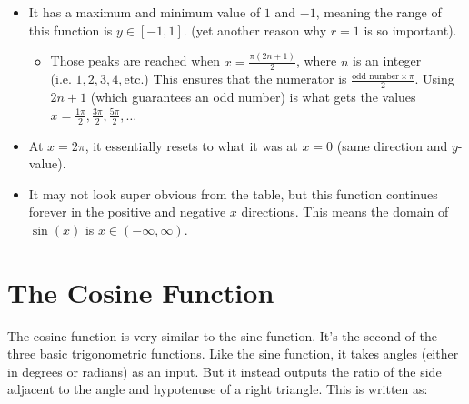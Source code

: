 \begin{itemize}
    \item It has a maximum and minimum value of $1$ and $-1$, meaning the range of this function is $y \in [-1, 1]$. (yet another reason why $r = 1$ is so important).
    \begin{itemize}
        \item Those peaks are reached when $x = \frac{\pi(2n + 1)}{2}$, where $n$ is an integer\\(i.e. $1,2,3,4,\text{etc.}$) This ensures that the numerator is $\frac{\text{odd number} \times \pi}{2}$. Using $2n + 1$ (which guarantees an odd number) is what gets the values 
        $x = \frac{1\pi}{2}, \frac{3\pi}{2}, \frac{5\pi}{2},\dots$
    \end{itemize}
    \item At $x = 2\pi$, it essentially resets to what it was at $x = 0$ (same direction and $y$-value).
    \item It may not look super obvious from the table, but this function continues forever in the positive and negative $x$ directions. This means the domain of $\sin(x)$ is $x \in (-\infty, \infty)$.
\end{itemize}
\clearpage
\section{The Cosine Function}
The cosine function is very similar to the sine function. It's the second of the three basic trigonometric functions. Like the sine function, it takes angles (either in degrees or radians) as an input. But it instead outputs the ratio of the side adjacent to the angle and hypotenuse of a right triangle. This is written as:

